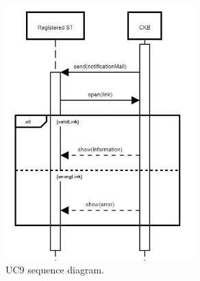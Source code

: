 \begin{center}
  \begin{figure} [H]
    \begin{center}
        \includegraphics[width=0.65\textwidth,height=\textheight,keepaspectratio]{Images/UseCaseDiagrams/UC9.png}
        \caption{UC9 sequence diagram.}
        \label{fig: UC9_sequence_diagram}
    \end{center}
  \end{figure}
\end{center}

